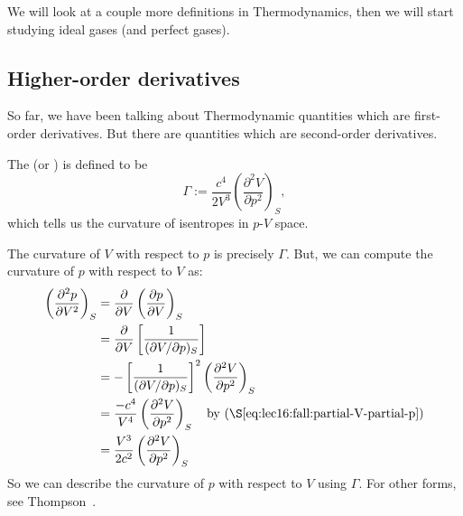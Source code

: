 
\lecture{}

We will look at a couple more definitions in Thermodynamics, then we
will start studying ideal gases (and perfect gases).

\subsection{Higher-order derivatives}

\begin{node}
So far, we have been talking about Thermodynamic quantities which are
first-order derivatives. But there are quantities which are
second-order derivatives.
\end{node}

\begin{definition}
The 
(or ) is defined to be
\begin{equation*}
\Gamma:=\frac{c^{4}}{2V^{3}}\left(\frac{\partial^{2}V}{\partial p^{2}}\right)_{S},
\end{equation*}
which tells us the curvature of isentropes in $p$-$V$ space.
\end{definition}

\begin{node}
The curvature of $V$ with respect to $p$ is precisely $\Gamma$. But,
we can compute the curvature of $p$ with respect to $V$ as:
\begin{subequations}
  \begin{align}
\left(\frac{\partial^{2}p}{\partial V^{2}}\right)_{S}
&= \frac{\partial}{\partial V}\left(\frac{\partial p}{\partial V}\right)_{S}\\
&= \frac{\partial}{\partial V}\left[\frac{1}{(\partial V/\partial p)_{S}}\right]\\
&= -\left[\frac{1}{(\partial V/\partial p)_{S}}\right]^{2}\left(\frac{\partial^{2}V}{\partial p^{2}}\right)_{S}\\
&= \frac{-c^{4}}{V^{4}}\left(\frac{\partial^{2}V}{\partial p^{2}}\right)_{S}\quad\mbox{by (\S\ref{eq:lec16:fall:partial-V-partial-p})}\\
&= \frac{V^{3}}{2c^{2}}\left(\frac{\partial^{2}V}{\partial p^{2}}\right)_{S}
  \end{align}
\end{subequations}
So we can describe the curvature of $p$ with respect to $V$ using
$\Gamma$. For other forms, see Thompson~\cite{thompson1971fundamental}.
\end{node}

